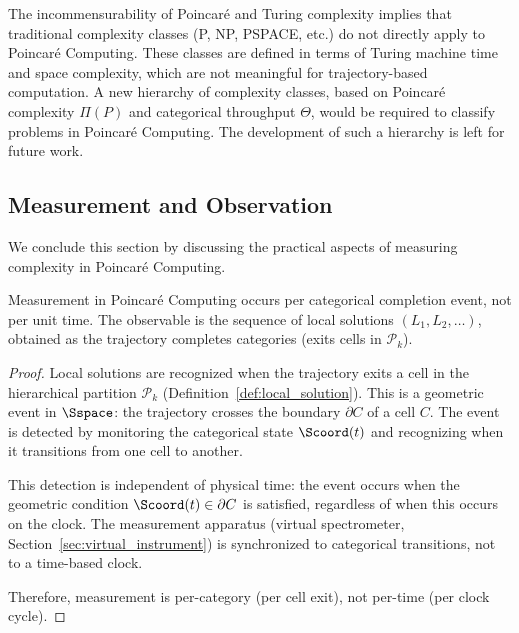 \begin{remark}
\label{rem:complexity_classes}
The incommensurability of Poincaré and Turing complexity implies that traditional complexity classes (P, NP, PSPACE, etc.) do not directly apply to Poincaré Computing. These classes are defined in terms of Turing machine time and space complexity, which are not meaningful for trajectory-based computation. A new hierarchy of complexity classes, based on Poincaré complexity $\Pi(P)$ and categorical throughput $\Theta$, would be required to classify problems in Poincaré Computing. The development of such a hierarchy is left for future work.
\end{remark}

\subsection{Measurement and Observation}

We conclude this section by discussing the practical aspects of measuring complexity in Poincaré Computing.

\begin{proposition}
\label{prop:per_category_measurement}
Measurement in Poincaré Computing occurs per categorical completion event, not per unit time. The observable is the sequence of local solutions $(L_1, L_2, \ldots)$, obtained as the trajectory completes categories (exits cells in $\mathcal{P}_k$).
\end{proposition}

\begin{proof}
Local solutions are recognized when the trajectory exits a cell in the hierarchical partition $\mathcal{P}_k$ (Definition~\ref{def:local_solution}). This is a geometric event in $\Sspace$: the trajectory crosses the boundary $\partial C$ of a cell $C$. The event is detected by monitoring the categorical state $\Scoord(t)$ and recognizing when it transitions from one cell to another.

This detection is independent of physical time: the event occurs when the geometric condition $\Scoord(t) \in \partial C$ is satisfied, regardless of when this occurs on the clock. The measurement apparatus (virtual spectrometer, Section~\ref{sec:virtual_instrument}) is synchronized to categorical transitions, not to a time-based clock.

Therefore, measurement is per-category (per cell exit), not per-time (per clock cycle).
\end{proof}

